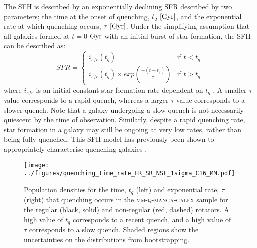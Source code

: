 \documentclass[useAMS,usenatbib]{mn2e}
\begin{document}
The SFH is described by an exponentially declining SFR described by two parameters; the time at the onset of quenching, $t_q~\rm{[Gyr]}$, and the exponential rate at which quenching occurs, $\tau~\rm{[Gyr]}$. Under the simplifying assumption that all galaxies formed at $t=0$ $\rm{ Gyr}$ with an initial burst of star formation, the SFH can be described as:
\begin{equation}\label{sfh}
SFR =
\begin{cases}
i_{sfr}(t_q) & \text{if } t < t_q \\
i_{sfr}(t_q) \times exp{\left( \frac{-(t-t_{q})}{\tau}\right)} & \text{if } t > t_q 
\end{cases}
\end{equation}
where $i_{sfr}$ is an initial constant star formation rate dependent on $t_q$ \citep{schawinski14, smethurst15}.  A smaller $\tau$ value corresponds to a rapid quench, whereas a larger $\tau$ value corresponds to a slower quench. Note that a galaxy undergoing a slow quench is not necessarily quiescent by the time of observation. Similarly, despite a rapid quenching rate, star formation in a galaxy may still be ongoing at very low rates, rather than being fully quenched. This SFH model has previously been shown to appropriately characterise quenching galaxies \citep{Weiner06, Martin07, Noeske07,schawinski14}. 

\begin{figure*}
\centering
\texttt{[image: ../figures/quenching\_time\_rate\_FR\_SR\_NSF\_1sigma\_C16\_MM.pdf]}
\caption{Population densities for the time, $t_q$ (left) and exponential rate, $\tau$ (right) that quenching occurs in the \textsc{mm-q-manga-galex} sample for the regular (black, solid) and non-regular (red, dashed) rotators. A high value of $t_q$ corresponds to a recent quench, and a high value of $\tau$ corresponds to a slow quench. Shaded regions show the uncertainties on the distributions from bootstrapping. %
}
\label{fig:popfrvsr}
\end{figure*}
\end{document}
